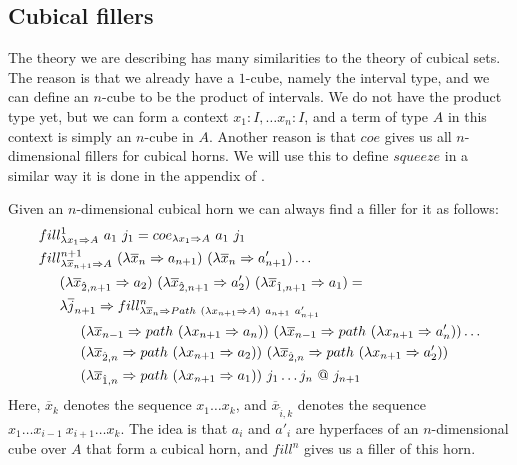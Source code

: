 \documentclass[8pt]{amsart}
\theoremstyle{definition}
\theoremstyle{remark}
\newcommand{\red}{\Rightarrow}
\numberwithin{figure}{section}
\begin{document}
\subsection{Cubical fillers}

The theory we are describing has many similarities to the theory of cubical sets.
The reason is that we already have a $1$-cube, namely the interval type, and we can define an $n$-cube to be the product of intervals.
We do not have the product type yet, but we can form a context $x_1 : I, \ldots x_n : I$, and a term of type $A$ in this context is simply an $n$-cube in $A$.
Another reason is that $coe$ gives us all $n$-dimensional fillers for cubical horns.
We will use this to define $squeeze$ in a similar way it is done in the appendix of \cite{cubical}.

Given an $n$-dimensional cubical horn we can always find a filler for it as follows:
\begin{align*}
& fill^1_{\lambda x_1 \red A}\ a_1\ j_1 = coe_{\lambda x_1 \red A}\ a_1\ j_1 \\
& fill^{n+1}_{\lambda \overline{x}_{n+1} \red A}\ (\lambda \overline{x}_n \red a_{n+1})\ (\lambda \overline{x}_n \red a'_{n+1}) \ldots \\
& \indent (\lambda \overline{x}_{\hat{2},n+1} \red a_2)\ (\lambda \overline{x}_{\hat{2},n+1} \red a'_2)\ (\lambda \overline{x}_{\hat{1},n+1} \red a_1) = \\
& \indent \lambda \overline{j}_{n+1} \red fill^n_{\lambda \overline{x}_n \red Path\ (\lambda x_{n+1} \red A)\ a_{n+1}\ a'_{n+1}} \\
& \indent \indent (\lambda \overline{x}_{n-1} \red path\ (\lambda x_{n+1} \red a_n))\ (\lambda \overline{x}_{n-1} \red path\ (\lambda x_{n+1} \red a'_n)) \ldots \\
& \indent \indent (\lambda \overline{x}_{\hat{2},n} \red path\ (\lambda x_{n+1} \red a_2))\ (\lambda \overline{x}_{\hat{2},n} \red path\ (\lambda x_{n+1} \red a'_2)) \\
& \indent \indent (\lambda \overline{x}_{\hat{1},n} \red path\ (\lambda x_{n+1} \red a_1))\ j_1 \ldots j_n\ @\ j_{n+1}
\end{align*}
Here, $\overline{x}_k$ denotes the sequence $x_1 \ldots x_k$, and $\overline{x}_{\hat{i},k}$ denotes the sequence $x_1 \ldots x_{i-1}\ x_{i+1} \ldots x_k$.
The idea is that $a_i$ and $a'_i$ are hyperfaces of an $n$-dimensional cube over $A$ that form a cubical horn, and $fill^n$ gives us a filler of this horn.
\end{document}
